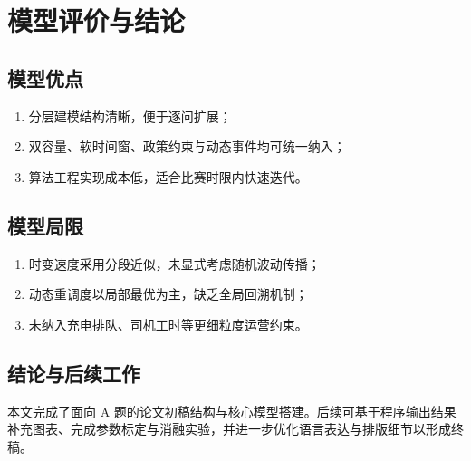 \section{模型评价与结论}

\subsection{模型优点}
\begin{enumerate}[label=\arabic*)]
    \item 分层建模结构清晰，便于逐问扩展；
    \item 双容量、软时间窗、政策约束与动态事件均可统一纳入；
    \item 算法工程实现成本低，适合比赛时限内快速迭代。
\end{enumerate}

\subsection{模型局限}
\begin{enumerate}[label=\arabic*)]
    \item 时变速度采用分段近似，未显式考虑随机波动传播；
    \item 动态重调度以局部最优为主，缺乏全局回溯机制；
    \item 未纳入充电排队、司机工时等更细粒度运营约束。
\end{enumerate}

\subsection{结论与后续工作}
本文完成了面向 A 题的论文初稿结构与核心模型搭建。后续可基于程序输出结果补充图表、完成参数标定与消融实验，并进一步优化语言表达与排版细节以形成终稿。
